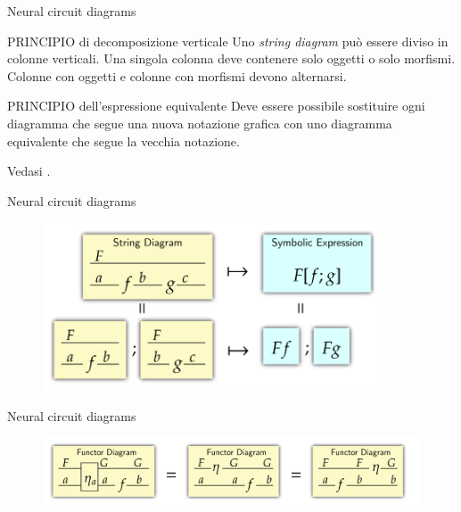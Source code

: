 \documentclass{beamer}
\begin{document}
\begin{frame}{Neural circuit diagrams}
    \begin{block}{PRINCIPIO di decomposizione verticale}
        Uno \textit{string diagram} può essere diviso in colonne verticali. Una singola colonna deve contenere solo oggetti o solo morfismi. Colonne con oggetti e colonne con morfismi devono alternarsi.
      \end{block}
      
      \begin{block}{PRINCIPIO dell'espressione equivalente}
        Deve essere possibile sostituire ogni diagramma che segue una nuova notazione grafica con uno diagramma equivalente che segue la vecchia notazione.
      \end{block}

      Vedasi \cite{abbott2024functor}.
\end{frame}

\begin{frame}{Neural circuit diagrams}
    \begin{figure}
        \begin{center}
            \includegraphics[width=0.9\textwidth]{figures/functors.png}
            \caption*{\cite{abbott2024functor}}
        \end{center}
    \end{figure}
\end{frame}

\begin{frame}{Neural circuit diagrams}
    \begin{figure}
        \begin{center}
            \includegraphics[width=\textwidth]{figures/natural_transformations.png}
            \caption*{\cite{abbott2024functor}}
        \end{center}
    \end{figure}
\end{frame}
\end{document}
